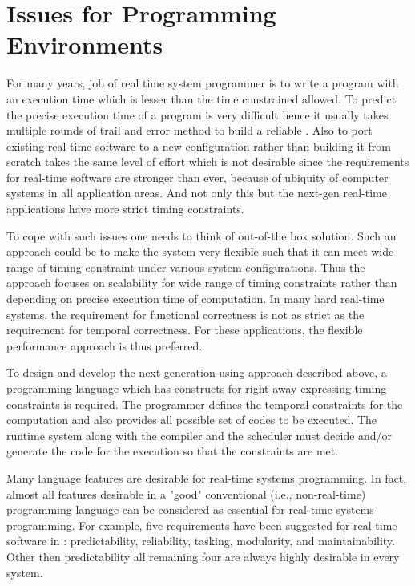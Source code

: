 \section{Issues for Programming Environments}
For many years, job of real time system programmer is to write a program with an execution time which is lesser than the time constrained allowed. To predict the precise execution time of a program is very difficult hence it usually takes multiple rounds of trail and error method to build a reliable \rts. Also to port existing real-time software to a new configuration rather than building it from scratch takes the same level of effort which is not desirable since the requirements for real-time software are stronger than ever, because of ubiquity of computer systems in all application areas. And not only this but the next-gen real-time applications have more strict timing constraints.

To cope with such issues one needs to think of out-of-the box solution. Such an approach could be to make the system very flexible such that it can meet wide range of timing constraint under various system configurations. Thus the approach focuses on scalability for wide range of timing constraints rather than depending on precise execution time of computation.
In many hard real-time systems, the requirement for functional correctness is not as strict as the requirement for temporal correctness. For these applications, the flexible performance approach is thus preferred\cite{Lin1995}.

To design and develop the next generation \rtsS using approach described above, a programming language which has constructs for right away expressing timing constraints is required. The programmer defines the temporal constraints for the computation and also provides all possible set of codes to be executed. The runtime system along with the compiler and the scheduler must decide and/or generate the code for the execution so that the constraints are met.

Many language features are desirable for real-time systems programming. In fact, almost all features desirable in a "good" conventional (i.e., non-real-time) programming language can be considered as essential for real-time systems programming. For example, five requirements have been suggested for real-time software in \cite{Stoyenko1993}: predictability, reliability, tasking, modularity, and maintainability. Other then predictability all remaining four are always highly desirable in every system. 

